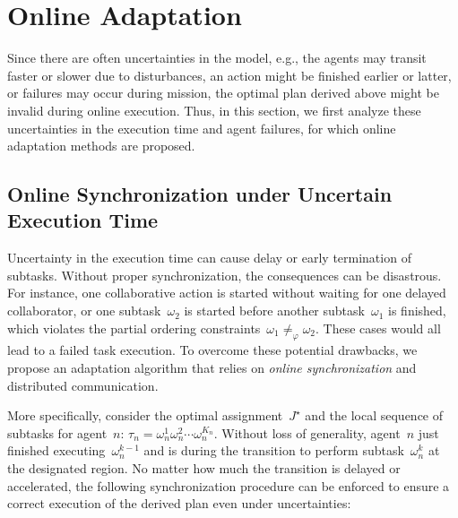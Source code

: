 \section{Online Adaptation}
\label{subsec:online-adaptation}

Since there are often uncertainties in the model, e.g., the agents may
transit faster or slower due to disturbances,
an action might be finished earlier or latter,
or failures may occur during mission,
the optimal plan derived above might be invalid during online execution.
Thus, in this section, we first analyze these uncertainties in the execution time
and agent failures, for which online adaptation methods are proposed.

\subsection{Online Synchronization under Uncertain Execution Time}\label{subsubsec:uncertain}
Uncertainty in the execution time can cause delay or early termination of subtasks.
Without proper synchronization, the consequences can be disastrous.
For instance, one collaborative action is started without waiting for one
delayed collaborator, or one subtask~$\omega_2$ is started before another
subtask~$\omega_1$ is finished, which violates the partial ordering
constraints~$\omega_1\neq_{\varphi} \omega_2$.
These cases would all lead to a failed task execution.
To overcome these potential drawbacks, we propose an adaptation algorithm
that relies on \emph{online synchronization} and distributed communication.

More specifically, consider the optimal assignment~$J^\star$ and the local
sequence of subtasks for agent~$n$: $\tau_n=\omega^1_n\omega^2_n\cdots \omega^{K_n}_n$.
Without loss of generality, agent~$n$ just finished executing~$\omega^{k-1}_n$ and
is during the transition to perform subtask~$\omega^k_n$ at the designated region.
No matter how much the transition is delayed or accelerated,
the following synchronization procedure can be enforced to
ensure a correct execution of the derived plan even under uncertainties:

